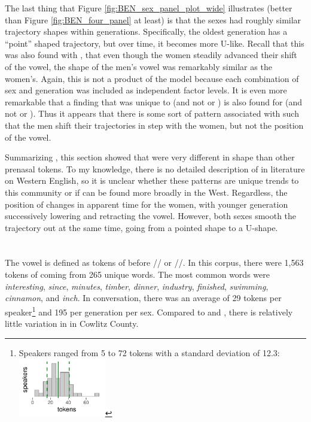 The last thing that Figure \ref{fig:BEN_sex_panel_plot_wide} illustrates (better than Figure \ref{fig:BEN_four_panel} at least) is that the sexes had roughly similar trajectory shapes within generations. Specifically, the oldest generation has a ``point'' shaped trajectory, but over time, it becomes more U-like. Recall that this was also found with \bet, that even though the women steadily advanced their shift of the vowel, the shape of the men's vowel was remarkably similar as the women's. Again, this is not a product of the model because each combination of sex and generation was included as independent factor levels. It is even more remarkable that a finding that was unique to \bet (and not \bat or \bit) is also found for \ben (and not \ban or \bin). Thus it appears that there is some sort of pattern associated with \dress such that the men shift their trajectories in step with the women, but not the position of the vowel.

Summarizing \ben, this section showed that \ben were very different in shape than other prenasal tokens. To my knowledge, there is no detailed description of \ben in literature on Western English, so it is unclear whether these patterns are unique trends to this community or if can be found more broadly in the West. Regardless, the position of \ben changes in apparent time for the women, with younger generation successively lowering and retracting the vowel. However, both sexes smooth the trajectory out at the same time, going from a pointed shape to a U-shape.



\section{\bin}
\label{BIN}

The \bin vowel is defined as tokens of \bit before // or //. In this corpus, there were 1,563 tokens of \bin coming from 265 unique words. The most common words were \textit{interesting}, \textit{since}, \textit{minutes}, \textit{timber}, \textit{dinner}, \textit{industry}, \textit{finished}, \textit{swimming}, \textit{cinnamon}, and \textit{inch}. In conversation, there was an average of 29 tokens per speaker\footnote{Speakers ranged from 5 to 72 tokens with a standard deviation of 12.3: \includegraphics[width = 1.5in]{Figures/BIN/BIN_tiny.pdf}} and 195 per generation per sex. Compared to \ban and \ben, there is relatively little variation in \bin in Cowlitz County.

